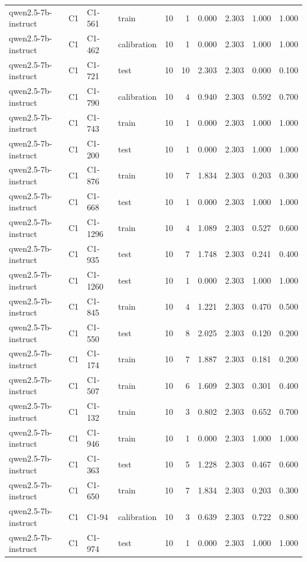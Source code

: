 \begin{table}
\begin{tabular}{llllrrrrrr}
qwen2.5-7b-instruct & C1 & C1-561 & train & 10 & 1 & 0.000 & 2.303 & 1.000 & 1.000 \\
qwen2.5-7b-instruct & C1 & C1-462 & calibration & 10 & 1 & 0.000 & 2.303 & 1.000 & 1.000 \\
qwen2.5-7b-instruct & C1 & C1-721 & test & 10 & 10 & 2.303 & 2.303 & 0.000 & 0.100 \\
qwen2.5-7b-instruct & C1 & C1-790 & calibration & 10 & 4 & 0.940 & 2.303 & 0.592 & 0.700 \\
qwen2.5-7b-instruct & C1 & C1-743 & train & 10 & 1 & 0.000 & 2.303 & 1.000 & 1.000 \\
qwen2.5-7b-instruct & C1 & C1-200 & test & 10 & 1 & 0.000 & 2.303 & 1.000 & 1.000 \\
qwen2.5-7b-instruct & C1 & C1-876 & train & 10 & 7 & 1.834 & 2.303 & 0.203 & 0.300 \\
qwen2.5-7b-instruct & C1 & C1-668 & test & 10 & 1 & 0.000 & 2.303 & 1.000 & 1.000 \\
qwen2.5-7b-instruct & C1 & C1-1296 & train & 10 & 4 & 1.089 & 2.303 & 0.527 & 0.600 \\
qwen2.5-7b-instruct & C1 & C1-935 & test & 10 & 7 & 1.748 & 2.303 & 0.241 & 0.400 \\
qwen2.5-7b-instruct & C1 & C1-1260 & test & 10 & 1 & 0.000 & 2.303 & 1.000 & 1.000 \\
qwen2.5-7b-instruct & C1 & C1-845 & train & 10 & 4 & 1.221 & 2.303 & 0.470 & 0.500 \\
qwen2.5-7b-instruct & C1 & C1-550 & test & 10 & 8 & 2.025 & 2.303 & 0.120 & 0.200 \\
qwen2.5-7b-instruct & C1 & C1-174 & train & 10 & 7 & 1.887 & 2.303 & 0.181 & 0.200 \\
qwen2.5-7b-instruct & C1 & C1-507 & train & 10 & 6 & 1.609 & 2.303 & 0.301 & 0.400 \\
qwen2.5-7b-instruct & C1 & C1-132 & train & 10 & 3 & 0.802 & 2.303 & 0.652 & 0.700 \\
qwen2.5-7b-instruct & C1 & C1-946 & train & 10 & 1 & 0.000 & 2.303 & 1.000 & 1.000 \\
qwen2.5-7b-instruct & C1 & C1-363 & test & 10 & 5 & 1.228 & 2.303 & 0.467 & 0.600 \\
qwen2.5-7b-instruct & C1 & C1-650 & train & 10 & 7 & 1.834 & 2.303 & 0.203 & 0.300 \\
qwen2.5-7b-instruct & C1 & C1-94 & calibration & 10 & 3 & 0.639 & 2.303 & 0.722 & 0.800 \\
qwen2.5-7b-instruct & C1 & C1-974 & test & 10 & 1 & 0.000 & 2.303 & 1.000 & 1.000 \\

\end{tabular}
\end{table}
